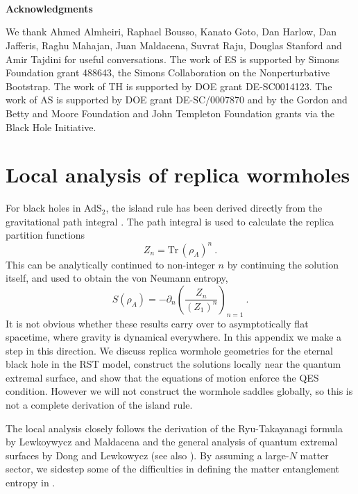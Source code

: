 \documentclass[11pt,oneside,letterpaper]{article}
\newcommand{\p}{\partial}
\newcommand{\be}{\begin{equation}}
\newcommand{\ee}{\end{equation}}
\def\be{\begin{eqnarray}}
\def\ee{\end{eqnarray}}
\newcommand{\tr}{\textrm{Tr}\,}
\def\be{\begin{equation}}
\def\ee{\end{equation}}
\renewcommand{\p}{\partial}
\numberwithin{equation}{section}
\def \be {\begin{equation}}
\def \ee {\end{equation}}
\begin{document}
\ \ 

\ \ 

\ \ 

\noindent \textbf{Acknowledgments}

\noindent We thank Ahmed Almheiri, Raphael Bousso, Kanato Goto, Dan Harlow, Dan Jafferis, Raghu Mahajan, Juan Maldacena, Suvrat Raju, Douglas Stanford and Amir Tajdini for useful conversations. The work of ES is supported by Simons Foundation grant 488643, the Simons Collaboration on the Nonperturbative Bootstrap. The work of TH is supported by DOE grant  DE-SC0014123. The work of AS is supported by DOE  grant DE-SC/0007870 and by the Gordon and Betty and Moore Foundation and John Templeton Foundation grants via the Black Hole Initiative. 





\appendix

\section{Local analysis of replica wormholes}

For black holes in AdS$_2$, the island rule has been derived directly from the gravitational path integral \cite{Almheiri:2019qdq,Penington:2019kki}. The path integral is used to calculate the replica partition functions
\be
Z_n = \tr (\rho_A)^n \ .
\ee
This can be analytically continued to non-integer $n$ by continuing the solution itself, and used to obtain the von Neumann entropy,
\be\label{replicaS}
S(\rho_A) =  - \p_n \left( \frac{Z_n}{(Z_1)^n} \right)_{n=1} \ .
\ee
It is not obvious whether these results carry over to asymptotically flat spacetime, where gravity is dynamical everywhere. In this appendix we make a step in this direction. We discuss replica wormhole geometries for the eternal black hole in the RST model, construct the solutions locally near the quantum extremal surface, and show that the equations of motion enforce the QES condition. However we will not construct the wormhole saddles globally, so this is not a complete derivation of the island rule.

The local analysis closely follows the derivation of the Ryu-Takayanagi formula by Lewkoywycz and Maldacena \cite{Lewkowycz:2013nqa} and the general analysis of quantum extremal surfaces by Dong and Lewkowycz \cite{Dong:2017xht} (see also \cite{Dong:2016hjy}). By assuming a large-$N$ matter sector, we sidestep some of the difficulties in defining the matter entanglement entropy in \cite{Dong:2017xht}.
\end{document}
